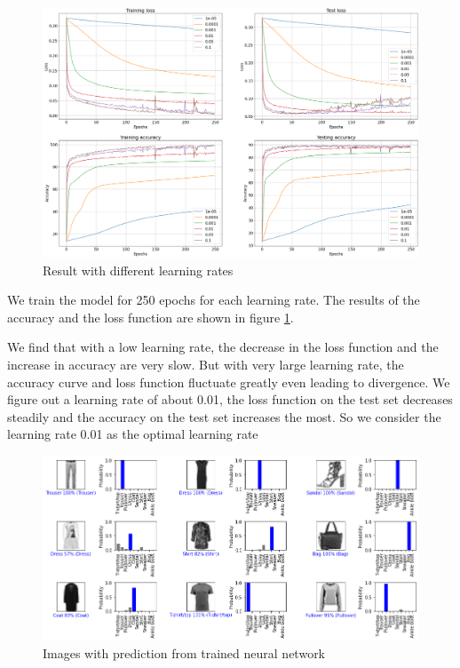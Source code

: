 \documentclass[14pt, a4paper]{article}
\numberwithin{equation}{section}
\numberwithin{algorithm}{section}
\numberwithin{figure}{section}
\begin{document}
\begin{figure}[h!]
  \centering
  \includegraphics[width=15cm]{learning_rate_comparisons.png}
  \caption{Result with different learning rates}
  \label{fig:learning_rate}
\end{figure}

We train the model for 250 epochs for each learning rate. 
The results of the accuracy and the loss function are shown in figure \ref{fig:learning_rate}.

We find that with a low learning rate, the decrease in the loss function and the increase in accuracy are very slow. 
But with very large learning rate, the accuracy curve and loss function fluctuate greatly even leading to divergence.
We figure out a learning rate of about 0.01, the loss function on the test set decreases steadily and the accuracy on the test set increases the most. 
So we consider the learning rate 0.01 as the optimal learning rate

\begin{figure}[h!]
  \centering
  \includegraphics[width=12cm]{images_with_predictions_1.png}
  \caption{Images with prediction from trained neural network}
  \label{fig:predict_1}
\end{figure}
\end{document}
